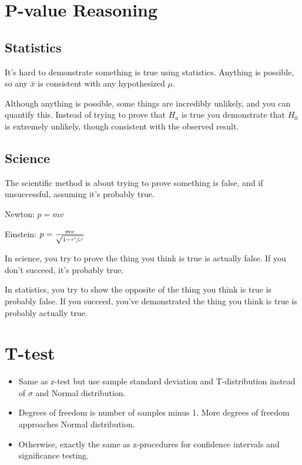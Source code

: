 \documentclass[letterpaper, landscape]{exam}
\begin{document}
  \section{P-value Reasoning} %

  \subsection{Statistics} %
  
  It's hard to demonstrate something is true using statistics. Anything is
  possible, so any $\bar{x}$ is consistent with any hypothesized $\mu$.
  
  Although anything is possible, some things are incredibly unlikely, and you
  can quantify this. Instead of trying to prove that $H_a$ is true you
  demonstrate that $H_0$ is extremely unlikely, though consistent with the
  observed result.

  \subsection{Science} %
  
  The scientific method is about trying to prove something is false, and if
  unsuccessful, assuming it's probably true.

  Newton: $p = mv$

  Einstein: $p = \frac{mv}{\sqrt{1 - \sfrac{v^2}{c^2}}}$
  
  In science, you try to prove the thing you think is true is actually false. If
  you don't succeed, it's probably true. 

  In statistics, you try to show the opposite of the thing you think is true is
  probably false. If you succeed, you've demonstrated the thing you think is true
  is probably actually true.

  \section{T-test} %

  \begin{itemize}
    \item Same as z-test but use sample standard deviation and T-distribution
      instead of $\sigma$ and Normal distribution.

    \item Degrees of freedom is number of samples minus 1. More degrees of
      freedom approaches Normal distribution.

    \item Otherwise, exactly the same as z-procedures for confidence intervals
      and significance testing.

  \end{itemize}
\end{document}
